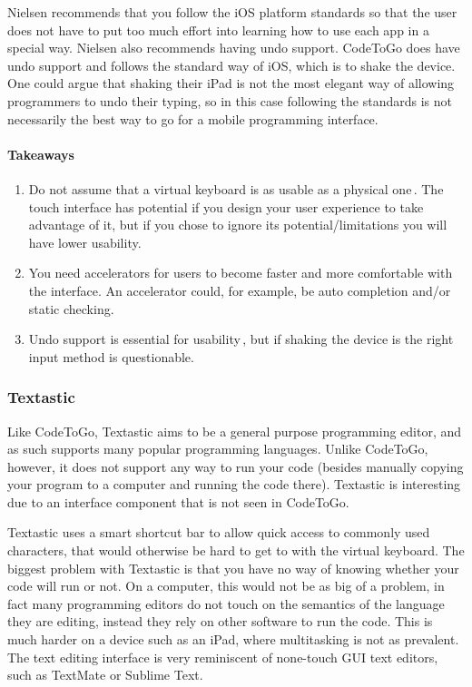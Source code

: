 Nielsen  recommends that you follow the iOS platform standards so that the user does not have to put too much effort into learning how to use each app in a special way. Nielsen also recommends having undo support. CodeToGo does have undo support and follows the standard way of iOS, which is to shake the device. One could argue that shaking their iPad is not the most elegant way of allowing programmers to undo their typing, so in this case following the standards is not necessarily the best way to go for a mobile programming interface.

\paragraph{Takeaways}
\begin{enumerate}
	\item Do not assume that a virtual keyboard is as usable as a physical one\,\cite{nielsen2013mobile}. The touch interface has potential if you design your user experience to take advantage of it, but if you chose to ignore its potential/limitations you will have lower usability.
	\item You need accelerators for users to become faster and more comfortable with the interface. An accelerator could, for example, be auto completion and/or static checking.
	\item Undo support is essential for usability\,\cite{nielsen1990heuristic}, but if shaking the device is the right input method is questionable.
\end{enumerate}

\subsubsection{Textastic}

Like CodeToGo, Textastic aims to be a general purpose programming editor, and as such supports many popular programming languages. Unlike CodeToGo, however, it does not support any way to run your code (besides manually copying your program to a computer and running the code there). Textastic is interesting due to an interface component that is not seen in CodeToGo.

Textastic uses a smart shortcut bar to allow quick access to commonly used characters, that would otherwise be hard to get to with the virtual keyboard. The biggest problem with Textastic is that you have no way of knowing whether your code will run or not. On a computer, this would not be as big of a problem, in fact many programming editors do not touch on the semantics of the language they are editing, instead they rely on other software to run the code. This is much harder on a device such as an iPad, where multitasking is not as prevalent. The text editing interface is very reminiscent of none-touch GUI text editors, such as TextMate or Sublime Text. 

